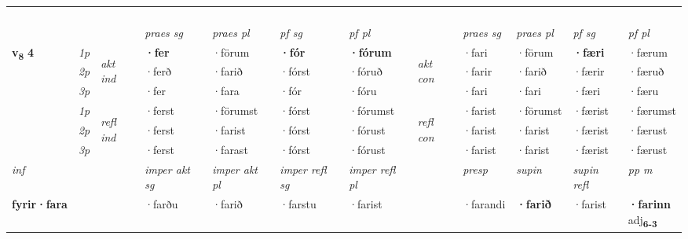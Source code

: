 \begin{longtable}[l]{X>{\footnotesize\itshape}llXXXXlXXXX}
\midrule
  & \\*
    & \\*
   & \\*
  & \\
   \midrule
 & &   & \textit{praes sg}  & \textit{praes pl}    & \textit{ pf sg} & \textit{pf pl} & & \textit{praes sg}  & \textit{praes pl}    & \textit{pf sg} & \textit{pf pl }  \\ \cmidrule{4-7} \cmidrule{9-12}
 \multirow{2}{*}{{{\textbf{v{\textsubscript{8}}} \Large{\textbf{4}}}}}  & 1p & \multirow{3}{*}{\begin{turn}{90}\textit{akt ind}\end{turn}} & \textbf{·fer} & ·förum & \textbf{·fór} & \textbf{·fórum} & \multirow{3}{*}{\begin{turn}{90}\textit{akt con}\end{turn}} &·fari & ·förum & \textbf{·færi} & ·færum\\*
 & 2p &  &  ·ferð  & ·farið & ·fórst & ·fóruð & & ·farir & ·farið & ·færir & ·færuð \\*
 & 3p &  & ·fer & ·fara & ·fór & ·fóru & & ·fari & ·fari& ·færi & ·færu \\*
\cmidrule{4-7} \cmidrule{9-12}
 & 1p & \multirow{3}{*}{\begin{turn}{90}\textit{refl ind}\end{turn}}  & ·ferst & ·förumst & ·fórst & ·fórumst & \multirow{3}{*}{\begin{turn}{90}\textit{refl con}\end{turn}}  &·farist & ·förumst & ·færist & ·færumst \\*
 & 2p &  & ·ferst & ·farist & ·fórst & ·fórust & &·farist & ·farist & ·færist & ·færust \\*
 & 3p  & & ·ferst & ·farast & ·fórst & ·fórust & & ·farist & ·farist& ·færist & ·færust \\*
\cmidrule{4-7} \cmidrule{9-12}

   {\textit{inf}} & &  & \textit{imper akt sg} & \textit{imper akt pl} & \textit{imper refl sg} & \textit{imper refl pl} && \textit{presp} & \textit{supin} & \textit{supin refl} & \textit{pp m} \\*
  {\textbf{fyrir\allowbreak ·fara}} & && ·farðu  & ·farið & ·farstu & ·farist && ·farandi &  \textbf{·farið} & ·farist & \specialcell{\textbf{·farinn} \\ adj\textbf{\textsubscript{6-3}}} \\*

\midrule


\end{longtable}
